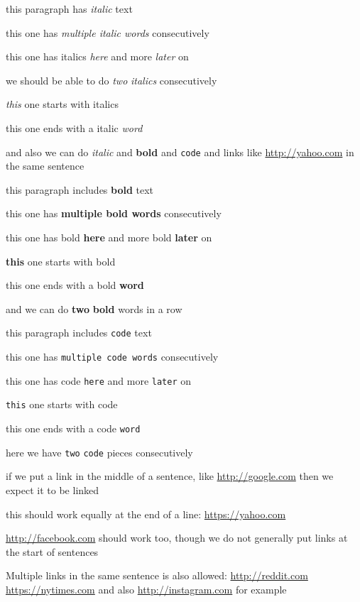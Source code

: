 

this paragraph has \emph{italic}  text


this one has \emph{multiple italic words}  consecutively


this one has italics \emph{here} and more \emph{later}  on


we should be able to do \emph{two} \emph{italics} consecutively


\emph{this} one starts with italics


this one ends with a italic \emph{word}


and also we can do \emph{italic} and \textbf{bold} and \verb|code| and links like \url{http://yahoo.com} in the same sentence


this paragraph includes \textbf{bold}  text


this one has \textbf{multiple bold words} consecutively


this one has bold \textbf{here} and more bold \textbf{later}  on


\textbf{this} one starts with bold


this one ends with a bold \textbf{word}


and we can do \textbf{two} \textbf{bold} words in a row


this paragraph includes \verb|code|  text


this one has \verb|multiple code words|  consecutively


this one has code \verb|here| and more \verb|later|  on


\verb|this| one starts with code


this one ends with a code \verb|word|


here we have \verb|two| \verb|code| pieces consecutively


if we put a link in the middle of a sentence, like \url{http://google.com} then we expect it to be linked


this should work equally at the end of a line: \url{https://yahoo.com}


\url{http://facebook.com} should work too, though we do not generally put links at the start of sentences


Multiple links in the same sentence is also allowed: \url{http://reddit.com} \url{https://nytimes.com} and also \url{http://instagram.com} for example